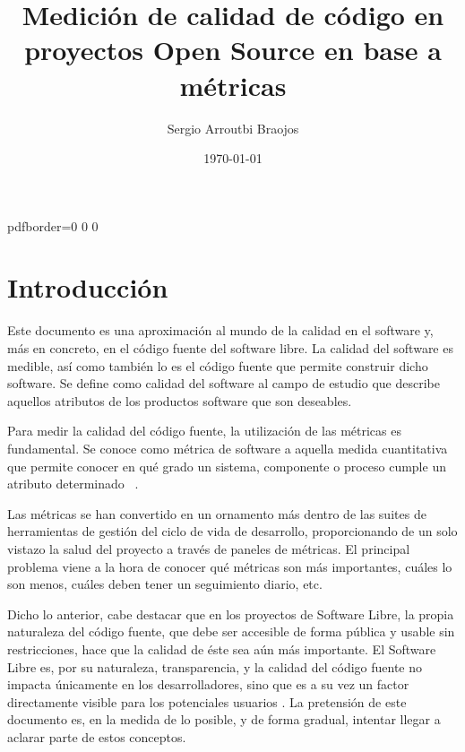 \documentclass[11pt]{article}
\title{\textbf{Medición de calidad de código en proyectos Open Source en base a métricas}}
\author{Sergio Arroutbi Braojos}
\date{\today}
\begin{document}
\renewcommand{\listtablename}{Lista de Tablas}
\renewcommand{\tablename}{TABLA} 

\hypersetup
{   
pdfborder={0 0 0}
}
   
\maketitle

\pagebreak

\tableofcontents
\listoftables
\listoffigures

\pagebreak

\section{Introducción}

Este documento es una aproximación al mundo de la calidad en el software y, más en concreto, en el código fuente del software libre. La calidad del software es medible, así como también lo es el código fuente que permite construir dicho software. Se define como calidad del software al campo de estudio que describe aquellos atributos de los productos software que son deseables.

Para medir la calidad del código fuente, la utilización de las métricas es fundamental. Se conoce como métrica de software a aquella medida cuantitativa que permite conocer en qué grado un sistema, componente o proceso cumple un atributo determinado ~\cite{ieeeglossary:softwareengineeringterminology}.

Las métricas se han convertido en un ornamento más dentro de las suites de herramientas de gestión del ciclo de vida de desarrollo, proporcionando de un solo vistazo la salud del proyecto a través de paneles de métricas.
El principal problema viene a la hora de conocer qué métricas son más importantes, cuáles lo son menos, cuáles deben tener un seguimiento diario, etc. ~\cite{abistock:usingmetrics}

Dicho lo anterior, cabe destacar que en los proyectos de Software Libre, la propia naturaleza del código fuente, que debe ser accesible de forma pública y usable sin restricciones, hace que la calidad de éste sea aún más importante. El Software Libre es, por su naturaleza, transparencia, y la calidad del código fuente no impacta únicamente en los desarrolladores, sino que es a su vez un factor directamente visible para los potenciales usuarios .
La pretensión de este documento es, en la medida de lo posible, y de forma gradual, intentar llegar a aclarar parte de estos conceptos.
\end{document}
